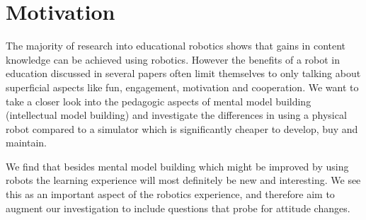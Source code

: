 \section{Motivation}
The majority of research into educational robotics shows that gains in content knowledge can be achieved using robotics. 
However the benefits of a robot in education discussed in several papers often limit themselves to only talking about superficial aspects like fun, engagement, motivation and cooperation. 
We want to take a closer look into the pedagogic aspects of mental model building (intellectual model building) and investigate the differences in using a physical robot compared to a simulator which is significantly cheaper to develop, buy and maintain.%

\bigskip\noindent
We find that besides mental model building which might be improved by using robots the learning experience will most definitely be new and interesting. We see this as an important aspect of the robotics experience, and therefore aim to augment our investigation to include questions that probe for attitude changes. 

